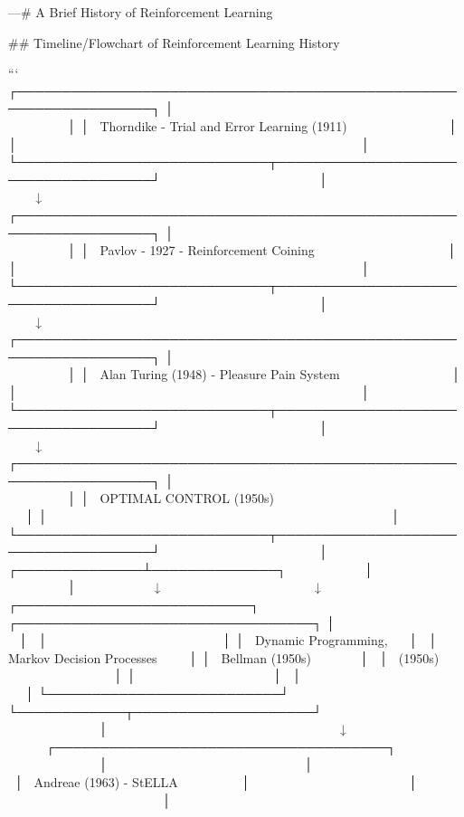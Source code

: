 ---# A Brief History of Reinforcement Learning

## Timeline/Flowchart of Reinforcement Learning History

```
┌─────────────────────────────────────────────────────────────────┐
│                                                                 │
│  Thorndike - Trial and Error Learning (1911)                   │
│                                                                 │
└────────────────────────────┬────────────────────────────────────┘
                             │
                             ↓
┌─────────────────────────────────────────────────────────────────┐
│                                                                 │
│  Pavlov - 1927 - Reinforcement Coining                         │
│                                                                 │
└────────────────────────────┬────────────────────────────────────┘
                             │
                             ↓
┌─────────────────────────────────────────────────────────────────┐
│                                                                 │
│  Alan Turing (1948) - Pleasure Pain System                     │
│                                                                 │
└────────────────────────────┬────────────────────────────────────┘
                             │
                             ↓
┌─────────────────────────────────────────────────────────────────┐
│                                                                 │
│  OPTIMAL CONTROL (1950s)                                       │
│                                                                 │
└────────────────────────────┬────────────────────────────────────┘
                             │
              ┌──────────────┴──────────────┐
              │                             │
              ↓                             ↓
┌──────────────────────────┐  ┌─────────────────────────────────┐
│                          │  │                                 │
│  Dynamic Programming,    │  │  Markov Decision Processes      │
│  Bellman (1950s)         │  │  (1950s)                        │
│                          │  │                                 │
└──────────────────────────┘  └────────────┬────────────────────┘
                                           │
                                           ↓
                             ┌─────────────────────────────────────┐
                             │                                     │
                             │  Andreae (1963) - StELLA            │
                             │                                     │
